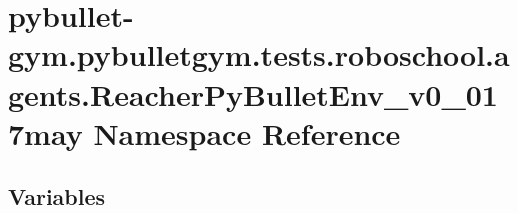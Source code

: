 \hypertarget{namespacepybullet-gym_1_1pybulletgym_1_1tests_1_1roboschool_1_1agents_1_1_reacher_py_bullet_env__v0__017may}{}\section{pybullet-\/gym.pybulletgym.\+tests.\+roboschool.\+agents.\+Reacher\+Py\+Bullet\+Env\+\_\+v0\+\_\+017may Namespace Reference}
\label{namespacepybullet-gym_1_1pybulletgym_1_1tests_1_1roboschool_1_1agents_1_1_reacher_py_bullet_env__v0__017may}
\subsection*{Variables}
